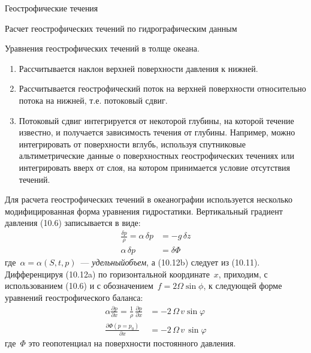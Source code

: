 \begin{chapter}{Геострофические течения}
\begin{section}{Расчет геострофических течений по гидрографическим данным}
\begin{paragraph}{Уравнения геострофических течений в толще океана.}
\begin{enumerate}
\item
Рассчитывается наклон верхней поверхности давления к нижней.
%

\item
Рассчитывается геострофический поток на верхней поверхности
относительно потока на нижней, т.е. потоковый сдвиг.
%

\item
Потоковый сдвиг интегрируется от некоторой глубины, на которой течение
известно, и получается зависимость течения от глубины. Например, можно
интегрировать от поверхности вглубь, используя спутниковые
альтиметрические данные о поверхностных геострофических течениях или
интегрировать вверх от слоя, на котором принимается условие отсутствия
течений.
%
\end{enumerate}
Для расчета геострофических течений в океанографии используется
несколько модифицированная форма уравнения гидростатики. Вертикальный
градиент давления (10.6) записывается в виде:
\begin{subequations}
\begin{align}
 \frac{\delta p}{\rho}=\alpha\,\delta p &=-g\,\delta z \\
 \alpha\,\delta p&=\delta\Phi
\end{align}
\end{subequations}
где~$\alpha = \alpha(S,t,p)$~--- \emph{удельныйобъем}, а (10.12b)
следует из (10.11). Дифференцируя (10.12a) по горизонтальной
координате~$x$, приходим, с использованием (10.6) и с 
обозначением~$f = 2 \Omega\sin \phi $, к следующей форме уравнений 
геострофического баланса:
\begin{subequations}
 \begin{align}
  \alpha\frac{\partial p}{\partial x} 
    =\frac{1}{\rho}\,\frac{\partial p}{\partial x} 
  & =-2\,\Omega \,v\sin \varphi \\
  \frac{\partial \Phi \left( p=p_0 \right)} {\partial x}
  & =-2\,\Omega \,v \, \sin{\varphi}
\end{align}
\end{subequations}
где~$\Phi$ это геопотенциал на поверхности постоянного давления.

\end{paragraph}
\end{section}
\end{chapter}
